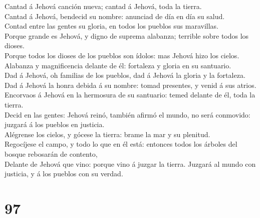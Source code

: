  Cantad á Jehová canción nueva; cantad á Jehová, toda la
tierra.\\
 Cantad á Jehová, bendecid su nombre: anunciad de día en día
su salud.\\
 Contad entre las gentes su gloria, en todos los pueblos sus
maravillas.\\
 Porque grande es Jehová, y digno de suprema alabanza;
terrible sobre todos los dioses.\\
 Porque todos los dioses de los pueblos son ídolos: mas
Jehová hizo los cielos.\\
 Alabanza y magnificencia delante de él: fortaleza y gloria
en su santuario.\\
 Dad á Jehová, oh familias de los pueblos, dad á Jehová la
gloria y la fortaleza.\\
 Dad á Jehová la honra debida á su nombre: tomad presentes,
y venid á sus atrios.\\
 Encorvaos á Jehová en la hermosura de su santuario: temed
delante de él, toda la tierra.\\
 Decid en las gentes: Jehová reinó, también afirmó el
mundo, no será conmovido: juzgará á los pueblos en justicia.\\
 Alégrense los cielos, y gócese la tierra: brame la mar y
su plenitud.\\
 Regocíjese el campo, y todo lo que en él está: entonces
todos los árboles del bosque rebosarán de contento,\\
 Delante de Jehová que vino: porque vino á juzgar la
tierra. Juzgará al mundo con justicia, y á los pueblos con su verdad.

\hypertarget{section-96}{%
\section{97}\label{section-96}}

